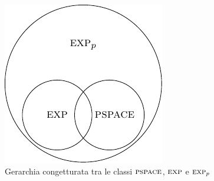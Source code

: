 \begin{figure}[h]
    \begin{center}
        \includegraphics{./img/timespacehierarchies/ExpvsExppvsPSpace.pdf}
        \caption{Gerarchia congetturata tra le classi $\textsc{pspace}$, $\textsc{exp}$ e $\textsc{exp}_{p}$}
    \end{center}
\end{figure}

